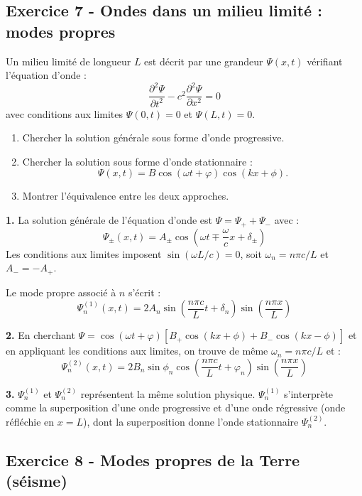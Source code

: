 \documentclass[12pt,a4paper]{article}
\begin{document}
\subsection*{Exercice 7 - Ondes dans un milieu limité : modes propres \niveau{\moyen}}

\begin{boiteexercice}
Un milieu limité de longueur $L$ est décrit par une grandeur $\Psi(x,t)$ vérifiant l'équation d'onde :
\[
\frac{\partial^2\Psi}{\partial t^2} - c^2\frac{\partial^2\Psi}{\partial x^2} = 0
\]
avec conditions aux limites $\Psi(0,t) = 0$ et $\Psi(L,t) = 0$.
\begin{enumerate}
  \item Chercher la solution générale sous forme d'onde progressive.
  \item Chercher la solution sous forme d'onde stationnaire :
  \[
  \Psi(x,t) = B\cos(\omega t+\varphi)\cos(kx+\phi).
  \]
  \item Montrer l'équivalence entre les deux approches.
\end{enumerate}
\end{boiteexercice}

\begin{boitecorrige}
\textbf{1.} La solution générale de l'équation d'onde est $\Psi = \Psi_+ + \Psi_-$ avec :
\[
\Psi_\pm(x,t) = A_\pm\cos\!\left(\omega t \mp \frac{\omega}{c}x + \delta_\pm\right)
\]
Les conditions aux limites imposent $\sin(\omega L/c) = 0$, soit $\omega_n = n\pi c/L$ et $A_- = -A_+$.

Le mode propre associé à $n$ s'écrit :
\[
\Psi_n^{(1)}(x,t) = 2A_n\sin\!\left(\frac{n\pi c}{L}t + \delta_n\right)\sin\!\left(\frac{n\pi x}{L}\right)
\]

\textbf{2.} En cherchant $\Psi = \cos(\omega t+\varphi)[B_+\cos(kx+\phi)+B_-\cos(kx-\phi)]$ et en appliquant les conditions aux limites, on trouve de même $\omega_n = n\pi c/L$ et :
\[
\Psi_n^{(2)}(x,t) = 2B_n\sin\phi_n\cos\!\left(\frac{n\pi c}{L}t + \varphi_n\right)\sin\!\left(\frac{n\pi x}{L}\right)
\]

\textbf{3.} $\Psi_n^{(1)}$ et $\Psi_n^{(2)}$ représentent la même solution physique. $\Psi_n^{(1)}$ s'interprète comme la superposition d'une onde progressive et d'une onde régressive (onde réfléchie en $x=L$), dont la superposition donne l'onde stationnaire $\Psi_n^{(2)}$.
\end{boitecorrige}

\subsection*{Exercice 8 - Modes propres de la Terre (séisme) \niveau{\difficile}}
\end{document}
